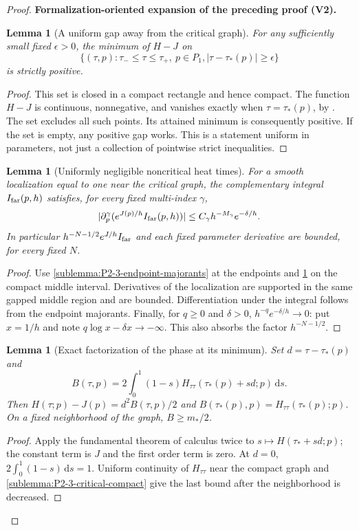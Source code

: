 \documentclass[11pt]{article}
\newtheorem{lemma}[theorem]{Lemma}
\newcommand{\formalisationparentid}{X}
\newenvironment{formalisationaddition}[1]{\par\medskip\begingroup\color{blue}\def\formalisationparentid{#1}\setcounter{formalizationsublemma}{0}\let\lemma\formalizationsublemma\let\endlemma\endformalizationsublemma
  \def\Eo{\mathcal E_h^\circ}\def\EE{\mathcal E_h}\def\phio{\phi_h^\circ}\def\phih{\phi_h}\def\Ho{H_h^{\rm atom}(v^\circ)}\def\Ha{H_h^{\rm atom}}\def\HL{H_h^{L}}\def\Dh{D_h}\def\Log{\operatorname{Log}}\def\ellh{\ell_h}\def\Gp{G_{p,h}}\def\Ast{A_{*,h}}\def\ahat{\widehat{\mathfrak a}_h}\def\ah{\mathfrak a_h}\def\rh{\widehat\rho_h}\def\deltah{\widehat\delta_h}\def\oldref##1{\textup{(##1)}}\def\interface##1{\par\noindent\textit{Analytical interface used here.} ##1\par}\def\finish{\par\noindent\textit{Conclusion of the formalization-oriented expansion.} }\par\noindent\textbf{Formalization-oriented expansion of the preceding proof (V2).}\par\smallskip
}{\par\endgroup\medskip
}
\begin{document}
\begin{proof}
\begin{formalisationaddition}{P2.3}
\begin{lemma}[A uniform gap away from the critical graph]\label{sublemma:P2-3-offgraph-gap}
For any sufficiently small fixed $\epsilon>0$, the minimum of $H-J$ on
\[
 \{(\tau,p):\tau_-\le\tau\le\tau_+,\ p\in P_1,
                  |\tau-\tau_*(p)|\ge\epsilon\}
\]
is strictly positive.
\end{lemma}
\begin{proof}
This set is closed in a compact rectangle and hence compact. The function
$H-J$ is continuous, nonnegative, and vanishes exactly when
$\tau=\tau_*(p)$, by . The set excludes all such
points. Its attained minimum is consequently positive. If the set is empty,
any positive gap works. This is a statement uniform in parameters, not just
a collection of pointwise strict inequalities.
\end{proof}

\begin{lemma}[Uniformly negligible noncritical heat times]\label{sublemma:P2-3-tails}
For a smooth localization equal to one near the critical graph, the
complementary integral $I_{\rm far}(p,h)$ satisfies, for every fixed
multi-index $\gamma$,
\[
 |\partial_p^\gamma(e^{J(p)/h}I_{\rm far}(p,h))|
       \le C_\gamma h^{-M_\gamma}e^{-\delta/h}.
\]
In particular $h^{-N-1/2}e^{J/h}I_{\rm far}$ and each fixed parameter
derivative are bounded, for every fixed $N$.
\end{lemma}
\begin{proof}
Use \ref{sublemma:P2-3-endpoint-majorants} at the endpoints and
\ref{sublemma:P2-3-offgraph-gap} on the compact middle interval.
Derivatives of the localization are supported in the same gapped middle
region and are bounded. Differentiation under the integral follows from
the endpoint majorants. Finally, for $q\ge0$ and $\delta>0$,
$h^{-q}e^{-\delta/h}\to0$: put $x=1/h$ and note
$q\log x-\delta x\to-\infty$. This also absorbs the factor $h^{-N-1/2}$.
\end{proof}

\begin{lemma}[Exact factorization of the phase at its minimum]\label{sublemma:P2-3-phase-factor}
Set $d=\tau-\tau_*(p)$ and
\[
 B(\tau,p)=2\int_0^1(1-s)
 H_{\tau\tau}(\tau_*(p)+sd;p)\,\mathrm ds.
\]
Then $H(\tau;p)-J(p)=d^2B(\tau,p)/2$ and
$B(\tau_*(p),p)=H_{\tau\tau}(\tau_*(p);p)$.
On a fixed neighborhood of the graph, $B\ge m_*/2$.
\end{lemma}
\begin{proof}
Apply the fundamental theorem of calculus twice to
$s\mapsto H(\tau_*+sd;p)$; the constant term is $J$ and the first
order term is zero. At $d=0$, $2\int_0^1(1-s)\,\mathrm ds=1$.
Uniform continuity of $H_{\tau\tau}$ near the compact graph and
\ref{sublemma:P2-3-critical-compact} give the last bound after the
neighborhood is decreased.
\end{proof}


\end{formalisationaddition}
\end{proof}
\end{document}
